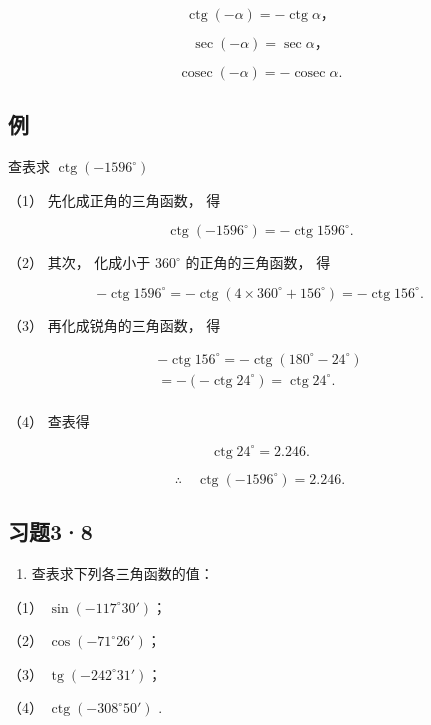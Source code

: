 \[
\operatorname{ctg} (- \alpha) = - \operatorname{ctg} \alpha \text{，}
\]

\[
\sec (- \alpha) = \sec \alpha \text{，}
\]

\[
\operatorname{cosec}(- \alpha) = - \operatorname{cosec}\alpha .
\]

\subsection{例}

查表求 \(\operatorname{ctg}(-1596^{\circ})\)

 （1） 先化成正角的三角函数， 得

\[
\operatorname{ctg} (- 1596 ^{\circ}) = - \operatorname{ctg} 1596 ^{\circ}.
\]

（2） 其次， 化成小于 \(360^{\circ}\) 的正角的三角函数， 得

\[
- \operatorname{ctg} 1596 ^{\circ} = - \operatorname{ctg} (4\times360^{\circ} + 156 ^{\circ}) = - \operatorname{ctg} 156 ^{\circ}.
\]

（3） 再化成锐角的三角函数， 得

\[
\begin{array}{l} - \operatorname{ctg} 156 ^{\circ} = - \operatorname{ctg} (180 ^{\circ} - 24 ^{\circ}) \\ = - (- \operatorname{ctg} 24 ^{\circ}) = \operatorname{ctg} 24 ^{\circ}. \\ \end{array}
\]

（4） 查表得

\[
\operatorname{ctg} 24 ^{\circ} = 2.246.
\]

\[
\therefore \quad \operatorname{ctg} (- 1596 ^{\circ}) = 2.246.
\]

\subsection{习题3·8}

\begin{enumerate}
\item
  查表求下列各三角函数的值：
\end{enumerate}

（1） \(\sin(-117^{\circ}30')\)；

（2） \(\cos(-71^{\circ}26')\)；

（3） \(\operatorname{tg}(-242^{\circ}31')\)；

（4） \(\operatorname{ctg}(-308^{\circ}50')\) .

